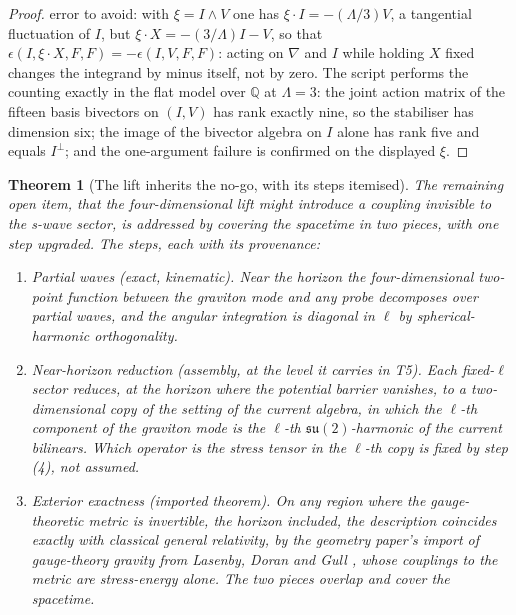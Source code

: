 \documentclass[11pt]{article}
\newtheorem{theorem}{Theorem}[section]
\theoremstyle{definition}
\theoremstyle{plain}
\begin{document}
\begin{proof}
error to avoid: with $\xi = I\wedge V$ one has $\xi\cdot I = -(\Lambda/3)V$, a tangential fluctuation of $I$, but $\xi\cdot X = -(3/\Lambda)I - V$, so that $\epsilon(I, \xi\cdot X, F, F) = -\epsilon(I, V, F, F)$: acting on $\nabla$ and $I$ while holding $X$ fixed changes the integrand by minus itself, not by zero. The script performs the counting exactly in the flat model over $\mathbb{Q}$ at $\Lambda = 3$: the joint action matrix of the fifteen basis bivectors on $(I, V)$ has rank exactly nine, so the stabiliser has dimension six; the image of the bivector algebra on $I$ alone has rank five and equals $I^\perp$; and the one-argument failure is confirmed on the displayed $\xi$.

\end{proof}

\begin{theorem}[The lift inherits the no-go, with its steps itemised]\label{c:dark-energy.lift-inherits-no-go-steps-itemised}
The remaining open item, that the four-dimensional lift might introduce a coupling invisible to the s-wave sector, is addressed by covering the spacetime in two pieces, with one step upgraded. The steps, each with its provenance:
\begin{enumerate}
\item \emph{Partial waves (exact, kinematic).} Near the horizon the four-dimensional two-point function between the graviton mode and any probe decomposes over partial waves, and the angular integration is diagonal in $\ell$ by spherical-harmonic orthogonality.
\item \emph{Near-horizon reduction (assembly, at the level it carries in T5).} Each fixed-$\ell$ sector reduces, at the horizon where the potential barrier vanishes, to a two-dimensional copy of the setting of the current algebra, in which the $\ell$-th component of the graviton mode is the $\ell$-th $\mathfrak{su}(2)$-harmonic of the current bilinears. Which operator is the stress tensor in the $\ell$-th copy is fixed by step (4), not assumed.
\item \emph{Exterior exactness (imported theorem).} On any region where the gauge-theoretic metric is invertible, the horizon included, the description coincides exactly with classical general relativity, by the geometry paper's import of gauge-theory gravity from Lasenby, Doran and Gull \cite[Fact~2.1]{ButlerT6}, whose couplings to the metric are stress-energy alone. The two pieces overlap and cover the spacetime.

\end{enumerate}
\end{theorem}
\end{document}
